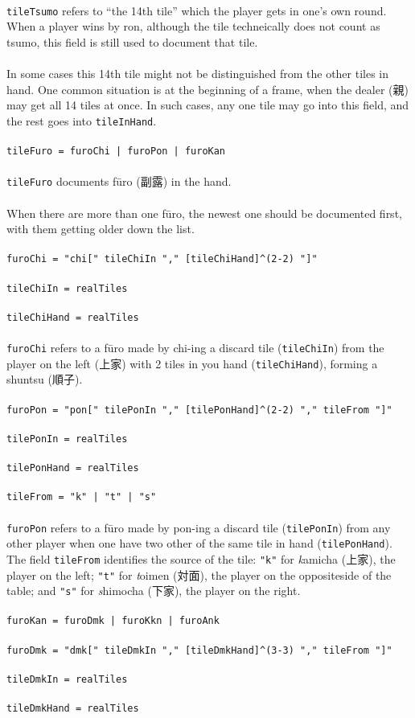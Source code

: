 \documentclass[%
	a4paper%
	,10pt%
	,twoside%
	,notitlepage%
]{article}%
\newcommand*{\ruleSymbol}{\textjapanese{⚠}}%
\newcommand*{\ruleMargin}{\marginpar{\flushright{}\ruleSymbol{}}}%
\newcommand*{\rulePar}{\paragraph*{\ruleMargin{}}}%
\begin{document}
			\paragraph*{}\lstinline/tileTsumo/ refers to ``the 14th tile'' which the player gets in one's own round. When a player wins by ron, although the tile techneically does not count as tsumo, this field is still used to document that tile. %
			\paragraph*{}In some cases this 14th tile might not be distinguished from the other tiles in hand. One common situation is at the beginning of a frame, when the dealer (\textjapanese{親}) may get all 14 tiles at once. In such cases, any one tile may go into this field, and the rest goes into \lstinline/tileInHand/. %
			\rulePar{}\lstinline/tileFuro = furoChi | furoPon | furoKan/%
			\paragraph*{}\lstinline/tileFuro/ documents f\={u}ro (\textjapanese{副露}) in the hand. %
			\rulePar{}When there are more than one f\={u}ro, the newest one should be documented first, with them getting older down the list. %
			\rulePar{}\lstinline/furoChi = "chi[" tileChiIn "," [tileChiHand]^(2-2) "]"/%
			\rulePar{}\lstinline/tileChiIn = realTiles/%
			\rulePar{}\lstinline/tileChiHand = realTiles/%
			\paragraph*{}\lstinline/furoChi/ refers to a f\={u}ro made by chi-ing a discard tile (\lstinline/tileChiIn/) from the player on the left (\textjapanese{上家}) with 2 tiles in you hand (\lstinline/tileChiHand/), forming a shuntsu (\textjapanese{順子}). %
			\rulePar{}\lstinline/furoPon = "pon[" tilePonIn "," [tilePonHand]^(2-2) "," tileFrom "]"/%
			\rulePar{}\lstinline/tilePonIn = realTiles/%
			\rulePar{}\lstinline/tilePonHand = realTiles/%
			\rulePar{}\lstinline/tileFrom = "k" | "t" | "s"/%
			\paragraph*{}\lstinline/furoPon/ refers to a f\={u}ro made by pon-ing a discard tile (\lstinline/tilePonIn/) from any other player when one have two other of the same tile in hand (\lstinline/tilePonHand/). The field \lstinline/tileFrom/ identifies the source of the tile: \lstinline/"k"/ for \textit{k\/}amicha (\textjapanese{上家}), the player on the left; \lstinline/"t"/ for \textit{t\/}oimen (\textjapanese{対面}), the player on the oppositeside of the table; and \lstinline/"s"/ for \textit{s\/}himocha (\textjapanese{下家}), the player on the right. %
			\rulePar{}\lstinline/furoKan = furoDmk | furoKkn | furoAnk/%
			\rulePar{}\lstinline/furoDmk = "dmk[" tileDmkIn "," [tileDmkHand]^(3-3) "," tileFrom "]"/%
			\rulePar{}\lstinline/tileDmkIn = realTiles/%
			\rulePar{}\lstinline/tileDmkHand = realTiles/%
\end{document}
